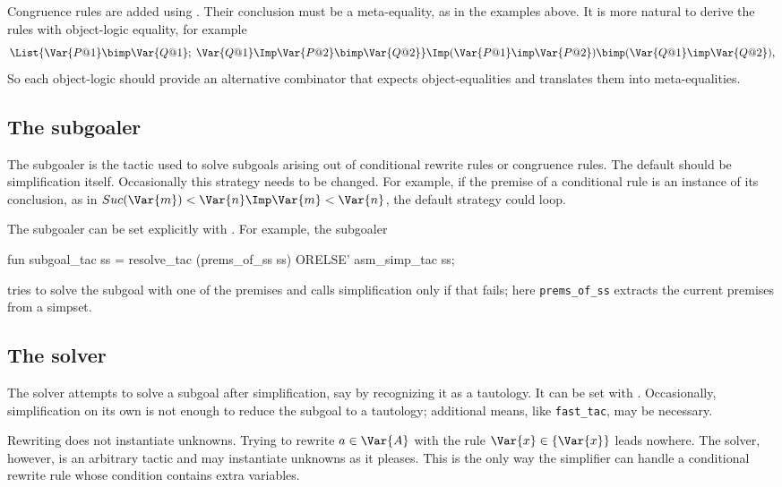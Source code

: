 Congruence rules are added using .  Their conclusion
must be a meta-equality, as in the examples above.  It is more
natural to derive the rules with object-logic equality, for example
\[ \List{\Var{P@1} \bimp \Var{Q@1};\; \Var{Q@1} \Imp \Var{P@2} \bimp \Var{Q@2}}
   \Imp (\Var{P@1} \imp \Var{P@2}) \bimp (\Var{Q@1} \imp \Var{Q@2}),
\]
So each object-logic should provide an alternative combinator
 that expects object-equalities and translates them into
meta-equalities.

\subsection{The subgoaler} 
The subgoaler is the tactic used to solve subgoals arising out of
conditional rewrite rules or congruence rules.  The default should be
simplification itself.  Occasionally this strategy needs to be changed.  For
example, if the premise of a conditional rule is an instance of its
conclusion, as in $Suc(\Var{m}) < \Var{n} \Imp \Var{m} < \Var{n}$, the
default strategy could loop.

The subgoaler can be set explicitly with .  For
example, the subgoaler
\begin{ttbox}
fun subgoal_tac ss = resolve_tac (prems_of_ss ss) ORELSE' 
                     asm_simp_tac ss;
\end{ttbox}
tries to solve the subgoal with one of the premises and calls
simplification only if that fails; here {\tt prems_of_ss} extracts the
current premises from a simpset.

\subsection{The solver} 
The solver attempts to solve a subgoal after simplification, say by
recognizing it as a tautology. It can be set with .
Occasionally, simplification on its own is not enough to reduce the subgoal
to a tautology; additional means, like \verb$fast_tac$, may be necessary.

\begin{warn}
  Rewriting does not instantiate unknowns.  Trying to rewrite $a\in
  \Var{A}$ with the rule $\Var{x}\in \{\Var{x}\}$ leads nowhere.  The
  solver, however, is an arbitrary tactic and may instantiate unknowns as
  it pleases.  This is the only way the simplifier can handle a conditional
  rewrite rule whose condition contains extra variables.
\end{warn}

